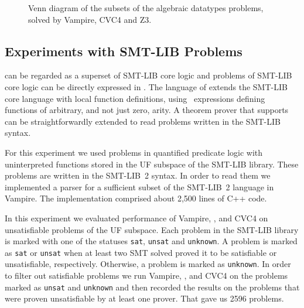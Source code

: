 \begin{figure}[tb]
  \centering
  \vspace{-0.3em}
  \caption{Venn diagram of the subsets of the algebraic datatypes problems, solved by Vampire, CVC4 and Z3.}
  \label{fig:isabelle-diagram}
\end{figure}

\subsection{Experiments with SMT-LIB Problems}

\folb{} can be regarded as a superset of SMT-LIB core logic and problems of SMT-LIB core logic can be directly expressed in \folb{}. The language of \folb{} extends the SMT-LIB core language with local function definitions, using \LETIN\ expressions defining functions of arbitrary, and not just zero, arity. A theorem prover that supports \folb{} can be straightforwardly extended to read problems written in the SMT-LIB syntax.

For this experiment we used problems in quantified predicate logic with uninterpreted functions stored in the UF subspace of the SMT-LIB library. These problems are written in the SMT-LIB~2 syntax. In order to read them we implemented a parser for a sufficient subset of the SMT-LIB~2 language in Vampire. The implementation comprised about 2,500 lines of C++ code. 

In this experiment we evaluated performance of Vampire, \oldcnfVampire, and CVC4 on unsatisfiable problems of the UF subspace. Each problem in the SMT-LIB library is marked with one of the statuses \verb'sat', \verb'unsat' and \verb'unknown'. A problem is marked as \verb'sat' or \verb'unsat' when at least two SMT solved proved it to be satisfiable or unsatisfiable, respectively. Otherwise, a problem is marked as \verb'unknown'. In order to filter out satisfiable problems we run Vampire, \oldcnfVampire, and CVC4 on the problems marked as \verb'unsat' and \verb'unknown' and then recorded the results on the problems that were proven unsatisfiable by at least one prover. That gave us 2596 problems.

